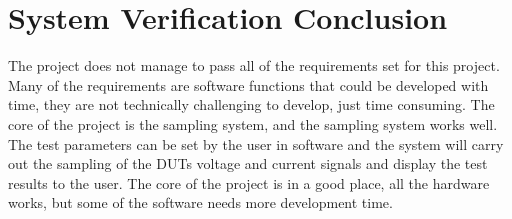 \section{System Verification Conclusion} \label{subsec:8_3_SystemVerifyConclude}
The project does not manage to pass all of the requirements set for this project. Many of the requirements are software functions that could be developed with time, they are not technically challenging to develop, just time consuming. The core of the project is the sampling system, and the sampling system works well. The test parameters can be set by the user in software and the system will carry out the sampling of the DUTs voltage and current signals and display the test results to the user. The core of the project is in a good place, all the hardware works, but some of the software needs more development time.

